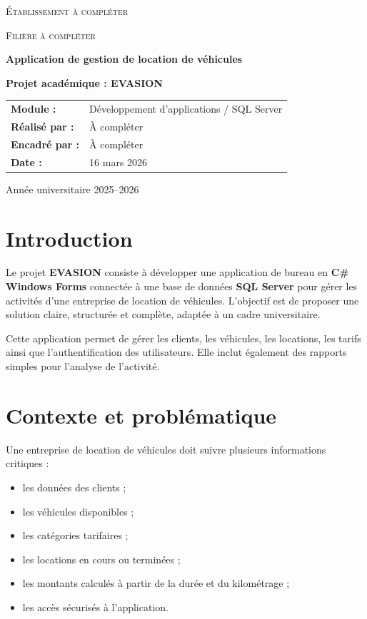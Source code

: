 \documentclass[12pt,a4paper]{report}
\begin{document}
\begin{titlepage}
    \centering
    {\scshape\LARGE Établissement à compléter \par}
    \vspace{1.5cm}
    {\scshape\Large Filière à compléter \par}
    \vspace{2cm}
    {\Huge\bfseries Application de gestion de location de véhicules \par}
    \vspace{0.5cm}
    {\LARGE\bfseries Projet académique : EVASION \par}
    \vspace{2cm}
    \begin{tabular}{>{\bfseries}p{5cm} p{8cm}}
        Module : & Développement d'applications / SQL Server \\
        Réalisé par : & À compléter \\
        Encadré par : & À compléter \\
        Date : & 16 mars 2026 \\
    \end{tabular}
    \vfill
    {\large Année universitaire 2025--2026 \par}
\end{titlepage}

\tableofcontents
\clearpage

\chapter*{Introduction}
Le projet \textbf{EVASION} consiste à développer une application de bureau en \textbf{C\# Windows Forms} connectée à une base de données \textbf{SQL Server} pour gérer les activités d'une entreprise de location de véhicules. L'objectif est de proposer une solution claire, structurée et complète, adaptée à un cadre universitaire.

Cette application permet de gérer les clients, les véhicules, les locations, les tarifs ainsi que l'authentification des utilisateurs. Elle inclut également des rapports simples pour l'analyse de l'activité.

\chapter{Contexte et problématique}
Une entreprise de location de véhicules doit suivre plusieurs informations critiques :
\begin{itemize}[leftmargin=1.2cm]
    \item les données des clients ;
    \item les véhicules disponibles ;
    \item les catégories tarifaires ;
    \item les locations en cours ou terminées ;
    \item les montants calculés à partir de la durée et du kilométrage ;
    \item les accès sécurisés à l'application.
\end{itemize}
\end{document}
